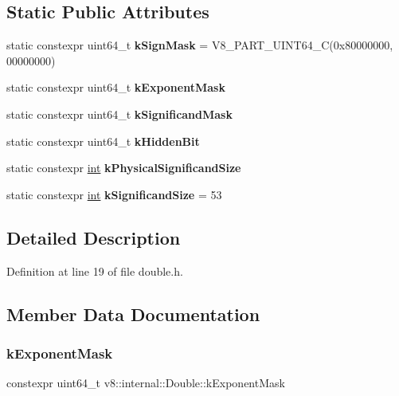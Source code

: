 \subsection*{Static Public Attributes}
\begin{DoxyCompactItemize}
\item 
\mbox{\label{classv8_1_1internal_1_1Double_a328408352393f7143c578c3b36d4c243}} 
static constexpr uint64\+\_\+t {\bfseries k\+Sign\+Mask} = V8\+\_\+P\+A\+R\+T\+\_\+\+U\+I\+N\+T64\+\_\+C(0x80000000, 00000000)
\item 
static constexpr uint64\+\_\+t {\bfseries k\+Exponent\+Mask}
\item 
static constexpr uint64\+\_\+t {\bfseries k\+Significand\+Mask}
\item 
static constexpr uint64\+\_\+t {\bfseries k\+Hidden\+Bit}
\item 
static constexpr \mbox{\hyperlink{classint}{int}} {\bfseries k\+Physical\+Significand\+Size}
\item 
\mbox{\label{classv8_1_1internal_1_1Double_ab778e5935726eafe19fa5693b8a8fdc6}} 
static constexpr \mbox{\hyperlink{classint}{int}} {\bfseries k\+Significand\+Size} = 53
\end{DoxyCompactItemize}


\subsection{Detailed Description}


Definition at line 19 of file double.\+h.



\subsection{Member Data Documentation}
\mbox{\label{classv8_1_1internal_1_1Double_a2c9b2ca0fb633dcdc920f7b64dff8aa6}} 
\subsubsection{\texorpdfstring{k\+Exponent\+Mask}{kExponentMask}}
{\footnotesize\ttfamily constexpr uint64\+\_\+t v8\+::internal\+::\+Double\+::k\+Exponent\+Mask\hspace{0.3cm}{\ttfamily [static]}}

